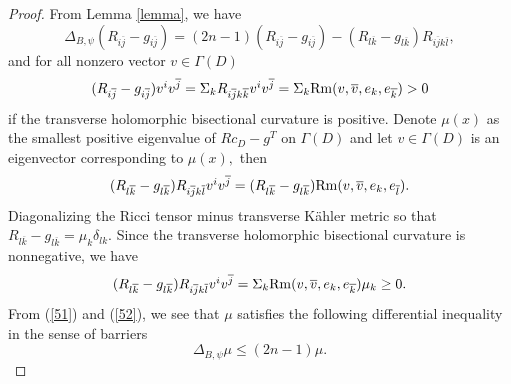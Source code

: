 \documentclass[12pt]{amsart}%
\numberwithin{equation}{section}
\begin{document}
\begin{proof}
From Lemma \ref{lemma}, we have
\begin{equation}
\Delta_{B,\psi}(R_{i\overline{j}}-g_{i\overline{j}})=(2n-1)(R_{i\overline{j}%
}-g_{i\overline{j}})-(R_{l\overline{k}}-g_{l\overline{k}})R_{i\overline
{j}k\overline{l}},\label{51}%
\end{equation}
and for all nonzero vector $v\in\Gamma(D)$
\[%
\begin{array}
[c]{c}%
(R_{i\overline{j}}-g_{i\overline{j}})v^{i}v^{\overline{j}}=\Sigma
_{k}R_{i\overline{j}k\overline{k}}v^{i}v^{\overline{j}}=\Sigma_{k}%
\mathrm{Rm}(v,\overline{v},e_{k},e_{\overline{k}})>0
\end{array}
\]
if the transverse holomorphic bisectional curvature is positive. Denote
$\mu(x)$ as the smallest positive eigenvalue of $Rc_{D}-g^{T}$ on $\Gamma(D)$
and let $v\in\Gamma(D)$ is an eigenvector corresponding to $\mu(x),$ then%
\[%
\begin{array}
[c]{c}%
(R_{l\overline{k}}-g_{l\overline{k}})R_{i\overline{j}k\overline{l}}%
v^{i}v^{\overline{j}}=(R_{l\overline{k}}-g_{l\overline{k}})\mathrm{Rm}%
(v,\overline{v},e_{k},e_{\overline{l}}).
\end{array}
\]
Diagonalizing the Ricci tensor minus transverse K\"{a}hler metric so that
$R_{l\overline{k}}-g_{l\overline{k}}=\mu_{k}\delta_{lk}$. Since the transverse
holomorphic bisectional curvature is nonnegative, we have%
\begin{equation}%
\begin{array}
[c]{c}%
(R_{l\overline{k}}-g_{l\overline{k}})R_{i\overline{j}k\overline{l}}%
v^{i}v^{\overline{j}}=\Sigma_{k}\mathrm{Rm}(v,\overline{v},e_{k}%
,e_{\overline{k}})\mu_{k}\geq0.
\end{array}
\label{52}%
\end{equation}
From (\ref{51}) and (\ref{52}), we see that $\mu$ satisfies the following
differential inequality in the sense of barriers
\begin{equation}
\Delta_{B,\psi}\mu\leq(2n-1)\mu.\label{53}%
\end{equation}



\end{proof}
\end{document}
